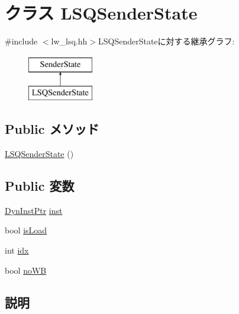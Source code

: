 \hypertarget{classOzoneLWLSQ_1_1LSQSenderState}{
\section{クラス LSQSenderState}
\label{classOzoneLWLSQ_1_1LSQSenderState}
}


{\ttfamily \#include $<$lw\_\-lsq.hh$>$}LSQSenderStateに対する継承グラフ:\begin{figure}[H]
\begin{center}
\leavevmode
\includegraphics[height=2cm]{classOzoneLWLSQ_1_1LSQSenderState}
\end{center}
\end{figure}
\subsection*{Public メソッド}
\begin{DoxyCompactItemize}
\item 
\hyperlink{classOzoneLWLSQ_1_1LSQSenderState_a0f4caf0593be7a2d809d7335984820d2}{LSQSenderState} ()
\end{DoxyCompactItemize}
\subsection*{Public 変数}
\begin{DoxyCompactItemize}
\item 
\hyperlink{classOzoneLWLSQ_a028ce10889c5f6450239d9e9a7347976}{DynInstPtr} \hyperlink{classOzoneLWLSQ_1_1LSQSenderState_af5d4fb974eeb4507d4c837d365d0cefc}{inst}
\item 
bool \hyperlink{classOzoneLWLSQ_1_1LSQSenderState_aaa492a23dd827a27baf0e8abcf09e391}{isLoad}
\item 
int \hyperlink{classOzoneLWLSQ_1_1LSQSenderState_ae40354a1051342eb5a9db005715dcfa9}{idx}
\item 
bool \hyperlink{classOzoneLWLSQ_1_1LSQSenderState_aee33f1eef98f14502c88334f70e6c03d}{noWB}
\end{DoxyCompactItemize}


\subsection{説明}
